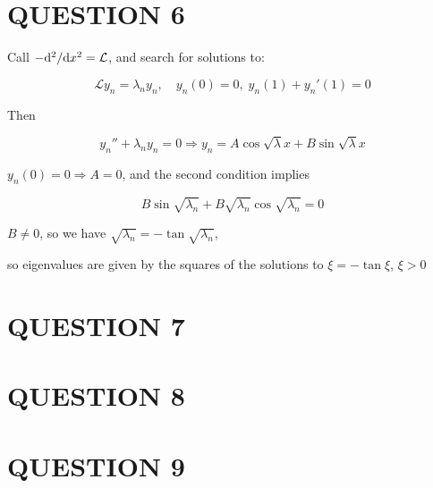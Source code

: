 \documentclass[a4paper]{article}
\begin{document}
\section{QUESTION 6}

Call $ -\mathrm{d}^{2} / \mathrm{d} x^{2} = \mathcal{L} $, and search for solutions to:

\[ \mathcal{L} y_{n} = \lambda_{n} y_{n}, \quad y_{n}(0) = 0, \;  y_{n}(1) + y_{n}'(1) = 0  \]
      
Then  
      
\[ y_{n}'' + \lambda_{n} y_{n} = 0 \Rightarrow y_{n} = A \cos \sqrt{\lambda} x + B \sin \sqrt{\lambda} x \]

$ y_{n}(0) = 0 \Rightarrow A = 0 $, and the second condition implies

\[ B \sin \sqrt{\lambda_{n}} + B \sqrt{\lambda_{n}} \cos \sqrt{\lambda_{n}} = 0 \]

$ B \neq 0 $, so we have $ \sqrt{\lambda_{n}} = - \tan \sqrt{\lambda_{n}}  $,

so eigenvalues are given by the squares of the solutions to $ \xi = - \tan \xi $, $ \xi > 0 $

\section{QUESTION 7}

\section{QUESTION 8}




\section{QUESTION 9}
\end{document}

